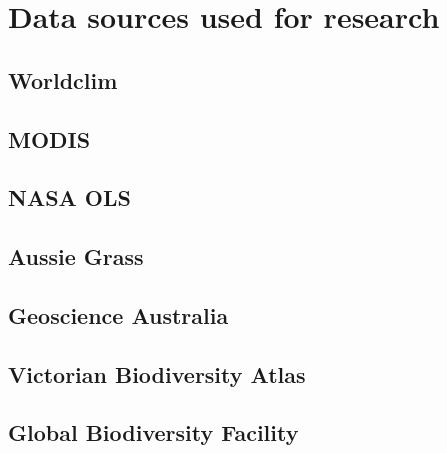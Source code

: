 \chapter{Data sources used for research}\label{apx:C}
\newpage

\section{Worldclim}

\section{MODIS}

\section{NASA OLS}

\section{Aussie Grass}

\section{Geoscience Australia}

\section{Victorian Biodiversity Atlas}

\section{Global Biodiversity Facility}